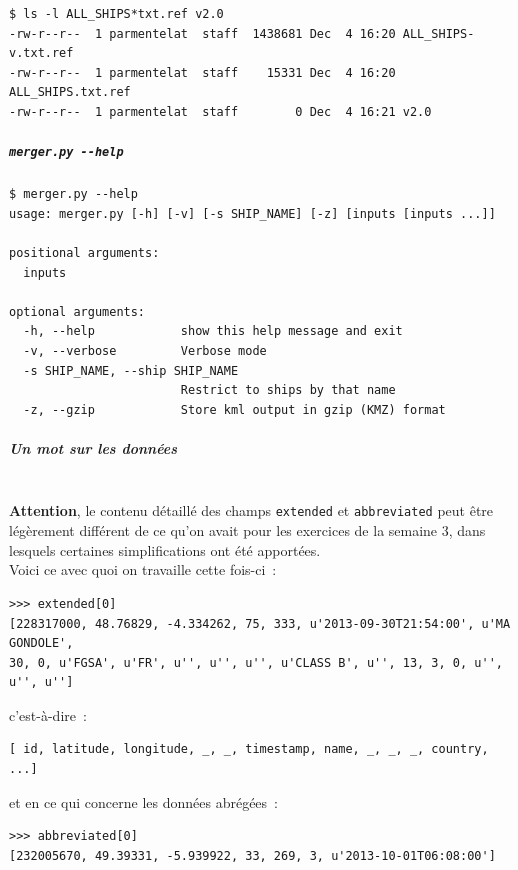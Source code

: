 \begin{verbatim}
$ ls -l ALL_SHIPS*txt.ref v2.0
-rw-r--r--  1 parmentelat  staff  1438681 Dec  4 16:20 ALL_SHIPS-v.txt.ref
-rw-r--r--  1 parmentelat  staff    15331 Dec  4 16:20 ALL_SHIPS.txt.ref
-rw-r--r--  1 parmentelat  staff        0 Dec  4 16:21 v2.0
\end{verbatim}

    \hypertarget{merger.py---help}{%
\subparagraph{\texorpdfstring{\texttt{merger.py\ -\/-help}}{merger.py -\/-help}}\label{merger.py---help}}

    \begin{verbatim}
$ merger.py --help
usage: merger.py [-h] [-v] [-s SHIP_NAME] [-z] [inputs [inputs ...]]

positional arguments:
  inputs

optional arguments:
  -h, --help            show this help message and exit
  -v, --verbose         Verbose mode
  -s SHIP_NAME, --ship SHIP_NAME
                        Restrict to ships by that name
  -z, --gzip            Store kml output in gzip (KMZ) format
\end{verbatim}

    \hypertarget{un-mot-sur-les-donnuxe9es}{%
\subparagraph{Un mot sur les données\\\\}\label{un-mot-sur-les-donnuxe9es}}

    \textbf{Attention}, le contenu détaillé des champs \texttt{extended} et
\texttt{abbreviated} peut être légèrement différent de ce qu'on avait
pour les exercices de la semaine 3, dans lesquels certaines
simplifications ont été apportées.\\

Voici ce avec quoi on travaille cette fois-ci~:

\begin{verbatim}
>>> extended[0]
[228317000, 48.76829, -4.334262, 75, 333, u'2013-09-30T21:54:00', u'MA GONDOLE',
30, 0, u'FGSA', u'FR', u'', u'', u'', u'CLASS B', u'', 13, 3, 0, u'', u'', u'']
\end{verbatim}

c'est-à-dire~:

\begin{verbatim}
[ id, latitude, longitude, _, _, timestamp, name, _, _, _, country, ...]
\end{verbatim}

et en ce qui concerne les données abrégées~:

\begin{verbatim}
>>> abbreviated[0]
[232005670, 49.39331, -5.939922, 33, 269, 3, u'2013-10-01T06:08:00']
\end{verbatim}

